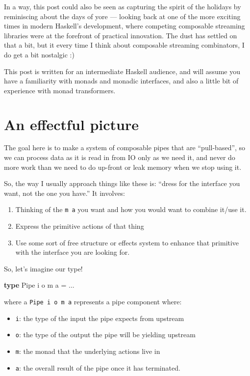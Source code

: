 \documentclass[]{article}
\newenvironment{Shaded}{}{}
\newcommand{\DataTypeTok}[1]{\textcolor[rgb]{0.56,0.13,0.00}{#1}}
\newcommand{\KeywordTok}[1]{\textcolor[rgb]{0.00,0.44,0.13}{\textbf{#1}}}
\newcommand{\NormalTok}[1]{#1}
\newcommand{\OperatorTok}[1]{\textcolor[rgb]{0.40,0.40,0.40}{#1}}
\newcommand{\OtherTok}[1]{\textcolor[rgb]{0.00,0.44,0.13}{#1}}
\begin{document}
In a way, this post could also be seen as capturing the spirit of the holidays
by reminiscing about the days of yore --- looking back at one of the more
exciting times in modern Haskell's development, where competing composable
streaming libraries were at the forefront of practical innovation. The dust has
settled on that a bit, but it every time I think about composable streaming
combinators, I do get a bit nostalgic :)

This post is written for an intermediate Haskell audience, and will assume you
have a familiarity with monads and monadic interfaces, and also a little bit of
experience with monad transformers.

\hypertarget{an-effectful-picture}{%
\section{An effectful picture}\label{an-effectful-picture}}

The goal here is to make a system of composable pipes that are ``pull-based'',
so we can process data as it is read in from IO only as we need it, and never do
more work than we need to do up-front or leak memory when we stop using it.

So, the way I usually approach things like these is: ``dress for the interface
you want, not the one you have.'' It involves:

\begin{enumerate}
\def\labelenumi{\arabic{enumi}.}
\tightlist
\item
  Thinking of the \texttt{m\ a} you want and how you would want to combine
  it/use it.
\item
  Express the primitive actions of that thing
\item
  Use some sort of free structure or effects system to enhance that primitive
  with the interface you are looking for.
\end{enumerate}

So, let's imagine our type!

\begin{Shaded}
\begin{Highlighting}[]
\KeywordTok{type} \DataTypeTok{Pipe}\NormalTok{ i o m a }\OtherTok{=} \OperatorTok{...}
\end{Highlighting}
\end{Shaded}

where a \texttt{Pipe\ i\ o\ m\ a} represents a pipe component where:

\begin{itemize}
\tightlist
\item
  \texttt{i}: the type of the input the pipe expects from upstream
\item
  \texttt{o}: the type of the output the pipe will be yielding upstream
\item
  \texttt{m}: the monad that the underlying actions live in
\item
  \texttt{a}: the overall result of the pipe once it has terminated.
\end{itemize}
\end{document}
